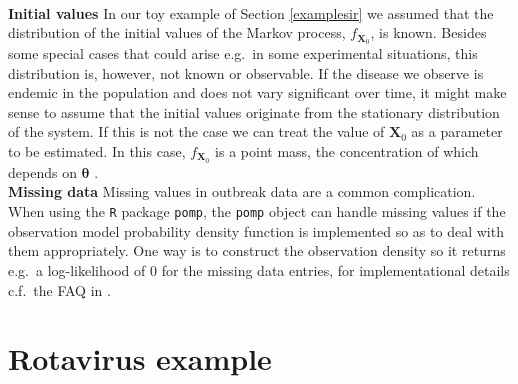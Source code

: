 \\
\newline
\textbf{Initial values}
In our toy example of Section \ref{examplesir}  we assumed that the distribution of the initial values of the Markov process, $f_{\bm{X}_0}$, is known. Besides some special cases that could arise e.g.\ in some experimental situations, this distribution is, however, not known or observable. If the disease we observe is  endemic in the population and does not vary significant over time, it might make sense to assume that the initial values originate from the stationary distribution of the system. If this is not the case we can treat the value of $\bm{X}_0$ as a parameter to be estimated. In this case, $f_{\bm{X}_0}$ is a point mass, the
concentration of which depends on $\bm{\theta}$ \citep{kingNgu}.\\
\newline
\textbf{Missing data} Missing values in outbreak data are a common complication.  When using the \texttt{R} package \texttt{pomp}, the \texttt{pomp} object  can handle missing values  if the observation model probability density function is  implemented so as to deal with them appropriately. 
One way is to  construct the  observation density  so it  returns   e.g.\ a log-likelihood  of $0$ for the missing data entries, for implementational details c.f.\ the FAQ in \cite{King2017}.

\section{Rotavirus example}

